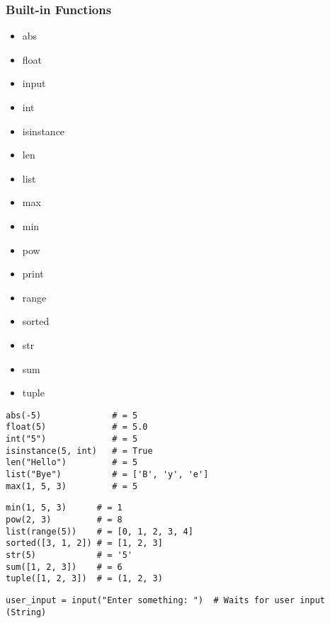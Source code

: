 \documentclass[11pt]{article}
\begin{document}
\subsubsection{Built-in Functions}
\vspace{-0.6cm}
\begin{multicols}{4}
  \begin{itemize}
      \item abs
      \item float
      \item input
      \item int
      \item isinstance
      \item len
      \item list
      \item max
      \item min
      \item pow
      \item print
      \item range
      \item sorted
      \item str
      \item sum
      \item tuple
  \end{itemize}
\end{multicols}
\vspace{-0.7cm}
\begin{multicols}{2}
\begin{lstlisting}
abs(-5)              # = 5
float(5)             # = 5.0
int("5")             # = 5
isinstance(5, int)   # = True
len("Hello")         # = 5
list("Bye")          # = ['B', 'y', 'e']
max(1, 5, 3)         # = 5
\end{lstlisting}
\begin{lstlisting}
min(1, 5, 3)      # = 1
pow(2, 3)         # = 8
list(range(5))    # = [0, 1, 2, 3, 4]
sorted([3, 1, 2]) # = [1, 2, 3]
str(5)            # = '5'
sum([1, 2, 3])    # = 6
tuple([1, 2, 3])  # = (1, 2, 3)
\end{lstlisting}
\end{multicols}
\vspace{-0.8cm}
\begin{lstlisting}
user_input = input("Enter something: ")  # Waits for user input (String)
\end{lstlisting}
\end{document}

